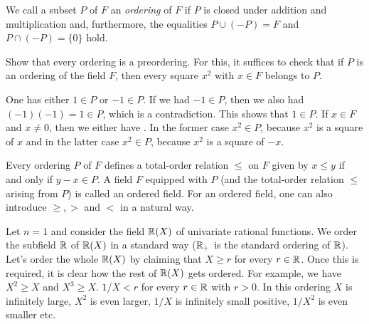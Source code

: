 We call a subset $P$ of $F$ an \emph{ordering} of $F$ if $P$ is closed under addition and multiplication and, furthermore, the equalities $P \cup (-P) = F$ and $P \cap (-P) = \{0\}$ hold. 

\begin{exercise}
\label{ex:ordering-preordering}
	Show that every ordering is a preordering. For this, it suffices to check that if $P$ is an ordering of the field $F$, then every square $x^2$ with $x \in F$ belongs to $P$.
\end{exercise} 
\begin{solution}
	One has either $1 \in P$ or $-1 \in P$. If we had $-1 \in P$, then we also had $(-1) (-1) = 1 \in P$, which is a contradiction. This shows that $1 \in P$. If $x \in F$ and $x \ne 0$, then we either have . In the former case $x^2 \in P$, because $x^2$ is a square of $x$ and in the latter case $x^2 \in P$, because $x^2$ is a square of $-x$. 
\end{solution}

Every ordering $P$ of $F$ defines a total-order relation $\le$ on $F$ given by $x \le y $ if and only if $y -x \in P$.  A field $F$ equipped with $P$ (and the total-order relation $\le$ arising from $P$) is called an ordered field. For an ordered field, one can also introduce $\ge, >$ and $<$ in a natural way. 

\begin{example}
	\label{ex:ordering:rational:functions}
	Let $n=1$ and consider the field $\mathbb{R}(X)$ of univariate rational functions. We order the subfield $\mathbb{R}$ of $\mathbb{R}(X)$ in a standard way ($\mathbb{R}_+$ is the standard ordering of $\mathbb{R}$). Let's order the whole $\mathbb{R}(X)$ by claiming that $X \ge r$ for every $r \in \mathbb{R}$. Once this is required, it is clear how the rest of $\mathbb{R}(X)$ gets ordered. For example, we have $X^2 \ge X$ and $X^3 \ge X$.
	 $1/X < r$ for every $r \in \mathbb{R}$ with $r > 0$. In this ordering $X$ is infinitely large, $X^2$ is even larger, $1/X$ is infinitely small positive, $1/X^2$ is even smaller etc. 
\end{example}


